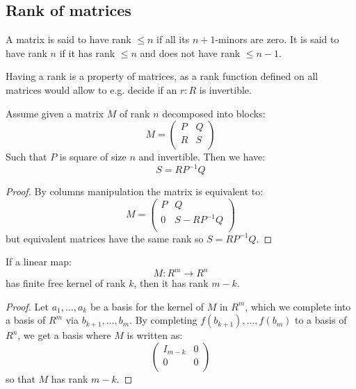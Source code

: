 \subsection{Rank of matrices}

\begin{definition}
A matrix is said to have rank $\leq n$ if all its $n+1$-minors are zero. It is said to have rank $n$ if it has rank $\leq n$ and does not have rank $\leq n-1$.
\end{definition}

Having a rank is a property of matrices, as a rank function defined on all matrices would allow to e.g. decide if an $r:R$ is invertible.

\begin{lemma}\label{rank-bloc-matrix}
Assume given a matrix $M$ of rank $n$ decomposed into blocks:
\[M = \begin{pmatrix}
P & Q  \\
R & S \\
\end{pmatrix}\]
Such that $P$ is square of size $n$ and invertible. Then we have:
\[S = RP^{-1}Q\]
\end{lemma}

\begin{proof}
By columns manipulation the matrix is equivalent to:
\[M = \begin{pmatrix}
P & Q  \\
0 & S - RP^{-1}Q \\
\end{pmatrix}\]
but equivalent matrices have the same rank so $S=RP^{-1}Q$.
\end{proof}

\begin{lemma}\label{rank-equivalent-definitions}
If a linear map:
\[M:R^m \to R^n\]
has finite free kernel of rank $k$, then it has rank $m-k$.
\end{lemma}

\begin{proof}
Let $a_1,\dots,a_{k}$ be a basis for the kernel of $M$ in $R^m$, which we complete into a basis of $R^m$ via $b_{k+1},\dots,b_m$. By completing $f(b_{k+1}),\dots, f(b_m)$ to a basis of $R^n$, we get a basis where $M$ is written as:
\[\begin{pmatrix}
I_{m-k} & 0  \\
0 & 0 \\
\end{pmatrix}\]
so that $M$ has rank $m-k$.
\end{proof}

